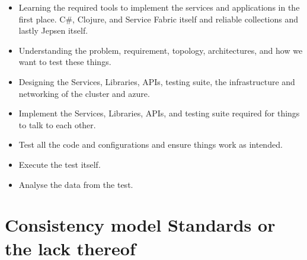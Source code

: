\documentclass[a4paper,10pt,titlepage]{report}
\begin{document}
    \begin{itemize}
        \item Learning the required tools to implement the services and applications in the first place. C\#, Clojure, and Service Fabric itself and reliable collections and lastly Jepsen itself.
        \item Understanding the problem, requirement, topology, architectures, and how we want to test these things.
        \item Designing the Services, Libraries, APIs, testing suite, the infrastructure and networking of the cluster and azure.
        \item Implement the Services, Libraries, APIs, and testing suite required for things to talk to each other.
        \item Test all the code and configurations and ensure things work as intended.
        \item Execute the test itself.
        \item Analyse the data from the test.
    \end{itemize}
    

\section{Consistency model Standards or the lack thereof}
\end{document}
